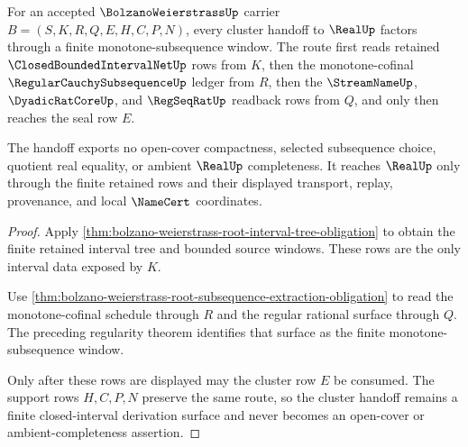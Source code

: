 \begin{theorem}
\label{thm:bolzano-weierstrass-closed-interval-cluster-handoff}
For an accepted $\BolzanoWeierstrassUp$ carrier $B=(S,K,R,Q,E,H,C,P,N)$, every cluster handoff to $\RealUp$ factors through a finite monotone-subsequence window. The route first reads retained $\ClosedBoundedIntervalNetUp$ rows from $K$, then the monotone-cofinal $\RegularCauchySubsequenceUp$ ledger from $R$, then the $\StreamNameUp$, $\DyadicRatCoreUp$, and $\RegSeqRatUp$ readback rows from $Q$, and only then reaches the seal row $E$.

The handoff exports no open-cover compactness, selected subsequence choice, quotient real equality, or ambient $\RealUp$ completeness. It reaches $\RealUp$ only through the finite retained rows and their displayed transport, replay, provenance, and local $\NameCert$ coordinates.
\end{theorem}
\begin{proof}
Apply \autoref{thm:bolzano-weierstrass-root-interval-tree-obligation} to obtain the finite retained interval tree and bounded source windows. These rows are the only interval data exposed by $K$.

Use \autoref{thm:bolzano-weierstrass-root-subsequence-extraction-obligation} to read the monotone-cofinal schedule through $R$ and the regular rational surface through $Q$. The preceding regularity theorem identifies that surface as the finite monotone-subsequence window.

Only after these rows are displayed may the cluster row $E$ be consumed. The support rows $H,C,P,N$ preserve the same route, so the cluster handoff remains a finite closed-interval derivation surface and never becomes an open-cover or ambient-completeness assertion.
\end{proof}


